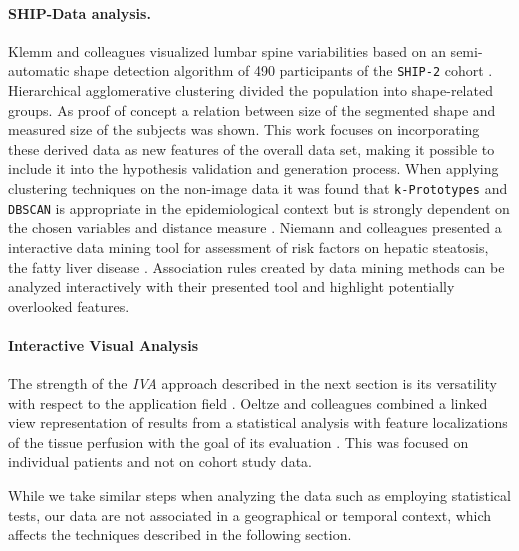\documentclass[journal]{style/vgtc} 			          %
\begin{document}
\paragraph{SHIP-Data analysis.}
Klemm and colleagues visualized lumbar spine variabilities based on an semi-automatic shape detection algorithm of 490 participants of the \texttt{SHIP-2} cohort \cite{Klemm2013VMV}.
%
Hierarchical agglomerative clustering divided the population into shape-related groups.
%
As proof of concept a relation between size of the segmented shape and measured size of the subjects was shown.
%
This work focuses on incorporating these derived data as new features of the overall data set, making it possible to include it into the hypothesis validation and generation process.
%
When applying clustering techniques on the non-image data it was found that \texttt{k-Prototypes} and \texttt{DBSCAN} is appropriate in the epidemiological context but is strongly dependent on the chosen variables and distance measure \cite{Klemm2014BVM}.
%
Niemann and colleagues presented a interactive data mining tool for assessment of risk factors on hepatic steatosis, the fatty liver disease \cite{Niemann2014}.
%
Association rules created by data mining methods can be analyzed interactively with their presented tool and highlight potentially overlooked features.

\paragraph{Interactive Visual Analysis}
The strength of the \emph{IVA} approach described in the next section is its versatility with respect to the application field \cite{Konyha2009}.
%
Oeltze and colleagues combined a linked view representation of results from a statistical analysis with feature localizations of the tissue perfusion with the goal of its evaluation \cite{Oeltze2007}.
%
This was focused on individual patients and not on cohort study data. 
%

While we take similar steps when analyzing the data such as employing statistical tests, our data are not associated in a geographical or temporal context, which affects the techniques described in the following section.
\end{document}
